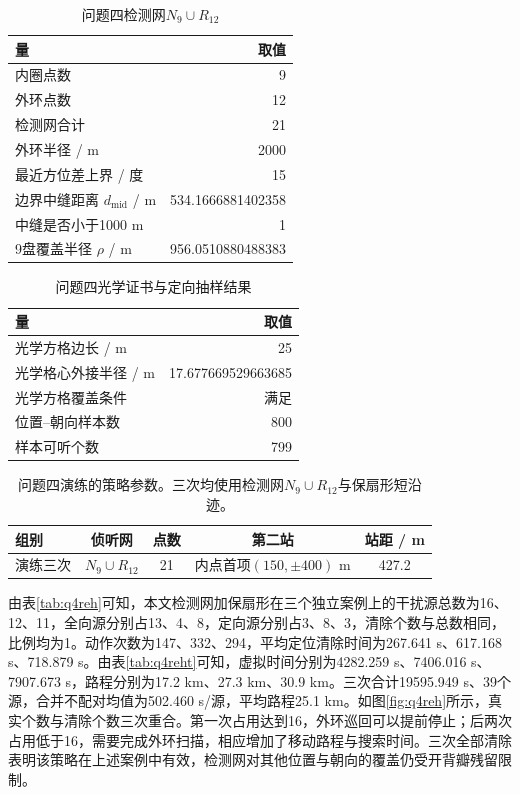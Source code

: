 \documentclass{cumcmthesis}
\begin{document}
\begin{table}[htbp]
\centering
\caption{问题四检测网$N_9\cup R_{12}$}
\label{tab:q4cov}
\begin{tabular}{lr}
\toprule
量 & 取值 \\
\midrule
内圈点数 & 9 \\
外环点数 & 12 \\
检测网合计 & 21 \\
外环半径 / m & 2000 \\
最近方位差上界 / 度 & 15 \\
边界中缝距离 $d_{\mathrm{mid}}$ / m & 534.1666881402358 \\
中缝是否小于1000 m & 1 \\
9盘覆盖半径 $\rho$ / m & 956.0510880488383 \\
\bottomrule
\end{tabular}
\end{table}

\begin{table}[htbp]
\centering
\caption{问题四光学证书与定向抽样结果}
\label{tab:q4cert}
\begin{tabular}{lr}
\toprule
量 & 取值 \\
\midrule
光学方格边长 / m & 25 \\
光学格心外接半径 / m & 17.677669529663685 \\
光学方格覆盖条件 & 满足 \\
位置--朝向样本数 & 800 \\
样本可听个数 & 799 \\
\bottomrule
\end{tabular}
\end{table}

\begin{table}[htbp]
\centering
\caption{问题四演练的策略参数。三次均使用检测网$N_9\cup R_{12}$与保扇形短沿迹。}
\label{tab:q4policy}
\scriptsize
\begin{tabular}{lcccc}
\toprule
组别 & 侦听网 & 点数 & 第二站 & 站距 / m \\
\midrule
演练三次 & $N_9\cup R_{12}$ & 21 & 内点首项$(150,\pm 400)$ m & 427.2 \\
\bottomrule
\end{tabular}
\end{table}

由表\ref{tab:q4reh}可知，本文检测网加保扇形在三个独立案例上的干扰源总数为16、12、11，全向源分别占13、4、8，定向源分别占3、8、3，清除个数与总数相同，比例均为1。动作次数为147、332、294，平均定位清除时间为267.641 s、617.168 s、718.879 s。由表\ref{tab:q4reht}可知，虚拟时间分别为4282.259 s、7406.016 s、7907.673 s，路程分别为17.2 km、27.3 km、30.9 km。三次合计19595.949 s、39个源，合并不配对均值为502.460 s/源，平均路程25.1 km。如图\ref{fig:q4reh}所示，真实个数与清除个数三次重合。第一次占用达到16，外环巡回可以提前停止；后两次占用低于16，需要完成外环扫描，相应增加了移动路程与搜索时间。三次全部清除表明该策略在上述案例中有效，检测网对其他位置与朝向的覆盖仍受开背瓣残留限制。
\end{document}
